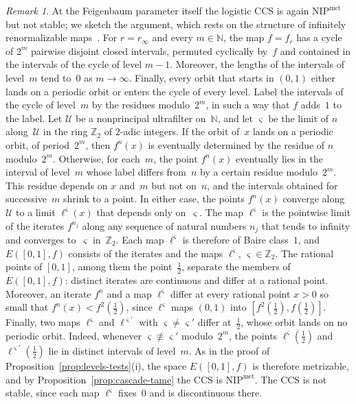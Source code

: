 \documentclass[psamsfonts]{amsart}
\theoremstyle{definition}
\theoremstyle{remark}
\newtheorem{rem}[thm]{Remark}
\newcommand{\NIP}{\text{NIP}}
\numberwithin{equation}{section}
\begin{document}
\begin{rem}\label{rem:logistic-feigenbaum}
At the Feigenbaum parameter itself the logistic CCS is again $\NIP^{\mathrm{met}}$ but not stable; we sketch the argument, which rests on the structure of infinitely renormalizable maps~\cite{BlockCoppel1992,deMeloVanStrien1993}.
For $r=r_\infty$ and every $m\in\mathbb{N}$, the map $f=f_r$ has a cycle of $2^m$ pairwise disjoint closed intervals, permuted cyclically by~$f$ and contained in the intervals of the cycle of level $m-1$.
Moreover, the lengths of the intervals of level~$m$ tend to~$0$ as $m\to\infty$.
Finally, every orbit that starts in $(0,1)$ either lands on a periodic orbit or enters the cycle of every level.
Label the intervals of the cycle of level~$m$ by the residues modulo~$2^m$, in such a way that $f$ adds~$1$ to the label.
Let $\mathcal{U}$ be a nonprincipal ultrafilter on~$\mathbb{N}$, and let $\varsigma$ be the limit of $n$ along~$\mathcal{U}$ in the ring $\mathbb{Z}_2$ of $2$-adic integers.
If the orbit of~$x$ lands on a periodic orbit, of period~$2^m$, then $f^n(x)$ is eventually determined by the residue of $n$ modulo~$2^m$.
Otherwise, for each~$m$, the point $f^n(x)$ eventually lies in the interval of level~$m$ whose label differs from~$n$ by a certain residue modulo~$2^m$.
This residue depends on $x$ and~$m$ but not on~$n$, and the intervals obtained for successive~$m$ shrink to a point.
In either case, the points $f^n(x)$ converge along~$\mathcal{U}$ to a limit $\ell^{\varsigma}(x)$ that depends only on~$\varsigma$.
The map $\ell^{\varsigma}$ is the pointwise limit of the iterates $f^{n_j}$ along any sequence of natural numbers $n_j$ that tends to infinity and converges to~$\varsigma$ in~$\mathbb{Z}_2$.
Each map $\ell^{\varsigma}$ is therefore of Baire class~$1$, and $E([0,1],f)$ consists of the iterates and the maps $\ell^{\varsigma}$, $\varsigma\in\mathbb{Z}_2$.
The rational points of $[0,1]$, among them the point~$\frac12$, separate the members of $E([0,1],f)$:
distinct iterates are continuous and differ at a rational point.
Moreover, an iterate $f^n$ and a map $\ell^{\varsigma}$ differ at every rational point $x>0$ so small that $f^n(x)<f^2(\frac12)$, since $\ell^{\varsigma}$ maps $(0,1)$ into $[f^2(\frac12),f(\frac12)]$.
Finally, two maps $\ell^{\varsigma}$ and $\ell^{\varsigma'}$ with $\varsigma\neq\varsigma'$ differ at~$\frac12$, whose orbit lands on no periodic orbit.
Indeed, whenever $\varsigma\not\equiv\varsigma'$ modulo~$2^m$, the points $\ell^{\varsigma}(\frac12)$ and $\ell^{\varsigma'}(\frac12)$ lie in distinct intervals of level~$m$.
As in the proof of Proposition~\ref{prop:levels-tests}(i), the space $E([0,1],f)$ is therefore metrizable, and by Proposition~\ref{prop:cascade-tame} the CCS is $\NIP^{\mathrm{met}}$.
The CCS is not stable, since each map $\ell^{\varsigma}$ fixes~$0$ and is discontinuous there.
\end{rem}
\end{document}
